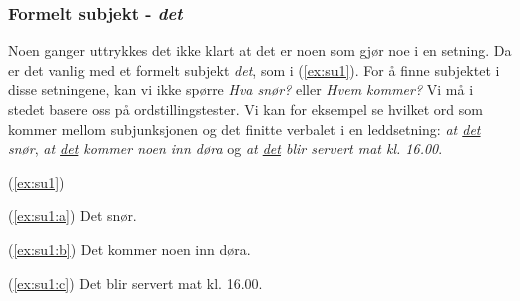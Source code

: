 \documentclass{article}
\begin{document}

\subsubsection{Formelt subjekt - {\it det}}

Noen ganger uttrykkes det ikke klart at det er noen som gj{\o}r noe i en setning. Da er det vanlig med et formelt subjekt {\it det}, som i (\ref{ex:su1}). For {\aa} finne subjektet i disse setningene, kan vi ikke sp{\o}rre {\it Hva sn{\o}r?} eller {\it Hvem kommer?} Vi m{\aa} i stedet basere oss p{\aa} ordstillingstester. Vi kan for eksempel se hvilket ord som kommer mellom subjunksjonen og det finitte verbalet i en leddsetning: {\it at \underline{det} sn{\o}r}, {\it at \underline{det} kommer noen inn d{\o}ra} og {\it at \underline{det} blir servert mat kl. 16.00}.

\begin{exe}
\ex\label{ex:su1} (\ref{ex:su1})
\begin{xlist}
\ex\label{ex:su1:a} (\ref{ex:su1:a}) Det sn{\o}r.

\ex\label{ex:su1:b} (\ref{ex:su1:b}) Det kommer noen inn d{\o}ra.

\ex\label{ex:su1:c} (\ref{ex:su1:c}) Det blir servert mat kl. 16.00.
\end{xlist}
\end{exe}

\end{document}
